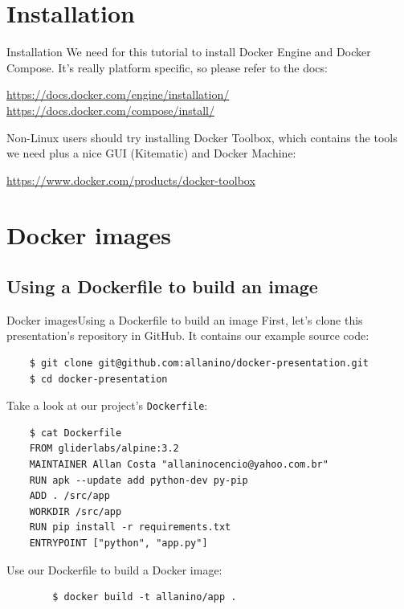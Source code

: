 \documentclass[10pt]{beamer}
\begin{document}
\section{Installation}
\begin{frame}{Installation}
	We need for this tutorial to install Docker Engine and Docker Compose. It's really platform specific, so please refer to the docs:
	
	\begin{center}
		\url{https://docs.docker.com/engine/installation/} \\
		\url{https://docs.docker.com/compose/install/}
	\end{center}
	
	Non-Linux users should try installing Docker Toolbox, which contains the tools we need plus a nice GUI (Kitematic) and Docker Machine:
	
	\begin{center}
		\url{https://www.docker.com/products/docker-toolbox}
	\end{center}
\end{frame}

\section{Docker images}
\subsection{Using a Dockerfile to build an image}
\begin{frame}[fragile]{Docker images}{Using a Dockerfile to build an image}
	First, let's clone this presentation's repository in GitHub. It contains our example
	source code:
	\begin{verbatim}
	$ git clone git@github.com:allanino/docker-presentation.git
	$ cd docker-presentation
	\end{verbatim}
	
	Take a look at our project's \texttt{Dockerfile}:
	\begin{verbatim}
	$ cat Dockerfile
	FROM gliderlabs/alpine:3.2
	MAINTAINER Allan Costa "allaninocencio@yahoo.com.br"
	RUN apk --update add python-dev py-pip
	ADD . /src/app
	WORKDIR /src/app
	RUN pip install -r requirements.txt
	ENTRYPOINT ["python", "app.py"]
	\end{verbatim}
	
	Use our Dockerfile to build a Docker image:
	\begin{verbatim}
		$ docker build -t allanino/app .
	\end{verbatim}
\end{frame}
\end{document}
